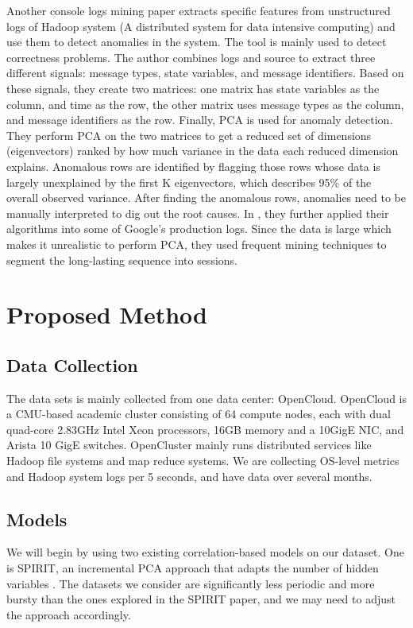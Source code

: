 Another console logs mining paper \cite{xu2009} extracts specific features from unstructured logs of Hadoop system \cite{ApacheSoftwareFoundation2011}  (A distributed system for data intensive computing) and use them to detect anomalies in the system. The tool is mainly used to detect correctness problems. The author combines logs and source to extract three different signals: message types, state variables, and message identifiers. Based on these signals, they create two matrices: one matrix has state variables as the column, and time as the row, the other matrix uses message types as the column, and message identifiers as the row. Finally, PCA is used for anomaly detection. They perform PCA on the two matrices to get a reduced set of dimensions (eigenvectors) ranked by how much variance in the data each reduced dimension explains. Anomalous rows are identified by flagging those rows whose data is largely unexplained by the first K eigenvectors, which describes 95\% of the overall observed variance. 
After finding the anomalous rows, anomalies need to be manually interpreted to dig out the root causes. In \cite{Xu}, they further applied their algorithms into some of Google's production logs. Since the data is large which makes it unrealistic to perform PCA, they used frequent mining techniques to segment the long-lasting sequence into sessions.

\section{Proposed Method}
\label{sec:method}

\subsection{Data Collection}
\label{sec:method:data}
The data sets is mainly collected from one data center: OpenCloud. OpenCloud is a CMU-based academic cluster consisting of 64 compute nodes, each with dual quad-core 2.83GHz Intel Xeon processors, 16GB memory and a 10GigE NIC, and Arista 10 GigE switches. OpenCluster mainly runs distributed services like Hadoop file systems and map reduce systems. We are collecting OS-level metrics and Hadoop system logs per 5 seconds, and have data over several months.

\subsection{Models}
\label{sec:method:models}
We will begin by using two existing correlation-based models on our dataset. One is SPIRIT, an incremental PCA approach that adapts the number of hidden variables \cite{Papadimitriou2005}. The datasets we consider are significantly less periodic and more bursty than the ones explored in the SPIRIT paper, and we may need to adjust the approach accordingly.

